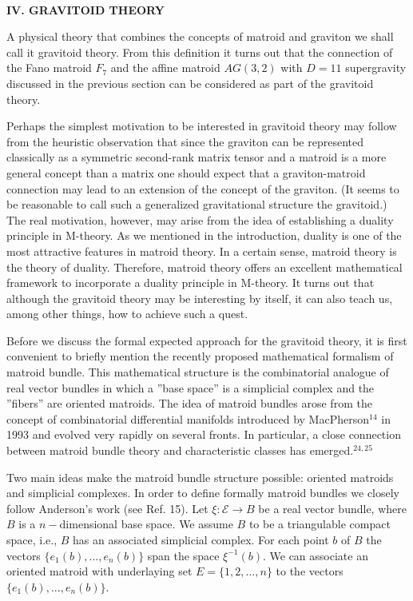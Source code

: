\documentclass[a4paper,12pt]{article}
\begin{document}
\bigskip

\smallskip\ 

\noindent \textbf{IV. GRAVITOID THEORY}

\bigskip

A physical theory that combines the concepts of matroid and graviton we
shall call it gravitoid theory. From this definition it turns out that the
connection of the Fano matroid $F_{7}$ and the affine matroid $AG(3,2)$ with 
$D=11$ supergravity discussed in the previous section can be considered as
part of the gravitoid theory.

Perhaps the simplest motivation to be interested in gravitoid theory may
follow from the heuristic observation that since the graviton can be
represented classically as a symmetric second-rank matrix tensor and a
matroid is a more general concept than a matrix one should expect that a
graviton-matroid connection may lead to an extension of the concept of the
graviton. (It seems to be reasonable to call such a generalized
gravitational structure the gravitoid.) The real motivation, however, may
arise from the idea of establishing a duality principle in M-theory. As we
mentioned in the introduction, duality is one of the most attractive
features in matroid theory. In a certain sense, matroid theory is the theory
of duality. Therefore, matroid theory offers an excellent mathematical
framework to incorporate a duality principle in M-theory. It turns out that
although the gravitoid theory may be interesting by itself, it can also
teach us, among other things, how to achieve such a quest.

Before we discuss the formal expected approach for the gravitoid theory, it
is first convenient to briefly mention the recently proposed mathematical
formalism of matroid bundle. This mathematical structure is the
combinatorial analogue of real vector bundles in which a ''base space'' is a
simplicial complex and the ''fibers'' are oriented matroids. The idea of
matroid bundles arose from the concept of combinatorial differential
manifolds introduced by MacPherson$^{14}$ in 1993 and evolved very rapidly
on several fronts. In particular, a close connection between matroid bundle
theory and characteristic classes has emerged.$^{24,25}$

Two main ideas make the matroid bundle structure possible: oriented matroids
and simplicial complexes. In order to define formally matroid bundles we
closely follow Anderson's work (see Ref. 15). Let $\xi :\mathcal{E}%
\rightarrow B$ be a real vector bundle, where $B$ is a $n-$dimensional base
space. We assume $B$ to be a triangulable compact space, i.e., $B$ has an
associated simplicial complex. For each point $b$ of $B$ the vectors $%
\{e_{1}(b),...,e_{n}(b)\}$ span the space $\xi ^{-1}(b)$. We can associate
an oriented matroid with underlaying set $E=\{1,2,...,n\}$ to the vectors $%
\{e_{1}(b),...,e_{n}(b)\}$.
\end{document}
